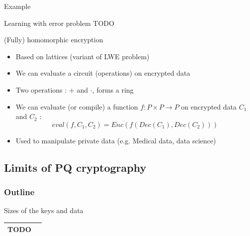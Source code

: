 \documentclass{beamer}
\begin{document}
\begin{frame}{Example}
\begin{figure}
		\center
	\end{figure}

\end{frame}

\begin{frame}{Learning with error problem}
	TODO
\end{frame}

\begin{frame}{(Fully) homomorphic encryption}
	\begin{itemize}
		\item Based on lattices (variant of LWE problem)
		\item<2-> We can evaluate a circuit (operations) on encrypted data
		\item<2-> Two operations : $+$ and $\cdot$, forms a ring
		\item<3-> We can evaluate (or compile) a function $f : P \times P \rightarrow P$ on encrypted data $C_1$ and $C_2$ :
			\[eval(f, C_1, C_2) = Enc(f(Dec(C_1), Dec(C_2)))\]
		\item<4-> Used to manipulate private data (e.g. Medical data, data science)
	\end{itemize}
\end{frame}

\subsection{Limits of PQ cryptography}
\begin{frame}
  \frametitle{Outline}
\end{frame}
\begin{frame}{Sizes of the keys and data}
	\begin{tabular}{|c|c|}
		\hline
		TODO & \\
		\hline
	\end{tabular}
\end{frame}
\end{document}
